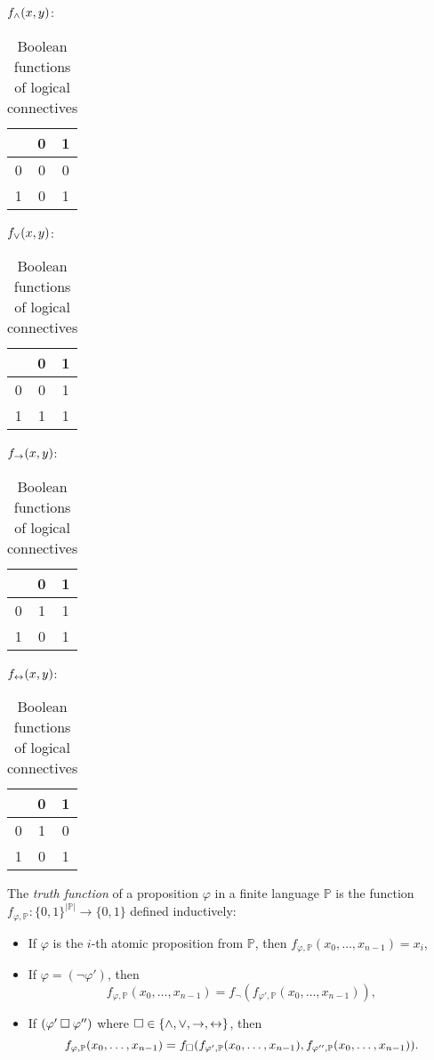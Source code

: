 \begin{table}
\centering
$f_{\land}(x,y)$:  
\begin{tabular}{c|cc}
      & 0 & 1  \\ \hline
    0 & 0 & 0  \\
    1 & 0 & 1 
\end{tabular}\quad
$f_{\lor}(x,y)$:         
\begin{tabular}{c|cc}
      & 0 & 1  \\ \hline
    0 & 0 & 1  \\
    1 & 1 & 1 
\end{tabular}\quad
$f_{\mathbin{\rightarrow}}(x,y)$:         
\begin{tabular}{c|cc}
      & 0 & 1  \\ \hline
    0 & 1 & 1  \\
    1 & 0 & 1 
\end{tabular}\quad
$f_{\mathbin{\leftrightarrow}}(x,y)$:         
\begin{tabular}{c|cc}
      & 0 & 1  \\ \hline
    0 & 1 & 0  \\
    1 & 0 & 1 
\end{tabular}
\caption{Boolean functions of logical connectives}
\label{table:boolean-functions-for-logical-connectives}    
\end{table}

\begin{definition}\label{definition:truth-function}
The \emph{truth function} of a proposition $\varphi$ in a finite language $\mathbb P$ is the function $f_{\varphi,\mathbb P}\colon\{0,1\}^{|\mathbb P|}\to\{0,1\}$ defined inductively:
\begin{itemize}
    \item If $\varphi$ is the $i$-th atomic proposition from $\mathbb P$, then $f_{\varphi,\mathbb P}(x_0,\dots,x_{n-1})=x_i$,
    \item If $\varphi = (\neg \varphi')$, then 
    $$
    f_{\varphi,\mathbb P}(x_0,\dots,x_{n-1}) = f_\neg(f_{\varphi',\mathbb P}(x_0,\dots,x_{n-1})),
    $$
    \item If $(\varphi' \mathbin{\square} \varphi'')$ where ${\mathbin{\square}} \in \{\land, \lor, \mathbin{\rightarrow}, \mathbin{\leftrightarrow}\}$, then 
    $$
    f_{\varphi,\mathbb P}(x_0,\dots,x_{n-1}) = f_{\mathbin{\square}}(f_{\varphi',\mathbb P}(x_0,\dots,x_{n-1}), f_{\varphi'',\mathbb P}(x_0,\dots,x_{n-1})).
    $$
\end{itemize}
\end{definition}

